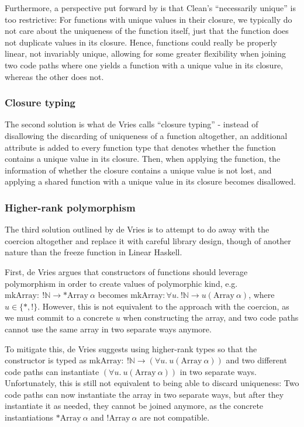 Furthermore, a perspective put forward by \cite{sergey_linearity_2022} is that Clean's ``necessarily unique'' is too restrictive: For functions with unique values in their closure, we typically do not care about the uniqueness of the function itself, just that the function does not duplicate values in its closure. Hence, functions could really be properly linear, not invariably unique, allowing for some greater flexibility when joining two code paths where one yields a function with a unique value in its closure, whereas the other does not.

\subsubsection{Closure typing}
The second solution is what de Vries calls ``closure typing'' - instead of disallowing the discarding of uniqueness of a function altogether, an additional attribute is added to every function type that denotes whether the function contains a unique value in its closure. Then, when applying the function, the information of whether the closure contains a unique value is not lost, and applying a shared function with a unique value in its closure becomes disallowed.

\subsubsection{Higher-rank polymorphism}
The third solution outlined by de Vries is to attempt to do away with the coercion altogether and replace it with careful library design, though of another nature than the freeze function in Linear Haskell. 

First, de Vries argues that constructors of functions should leverage polymorphism in order to create values of polymorphic kind, e.g.\ $\mathrm{mkArray} :\ !\mathbb{N} \to *\mathrm{Array}\ \alpha$ becomes $\mathrm{mkArray} : \forall u.\ !\mathbb{N} \to u(\mathrm{Array}\ \alpha)$, where $u \in \{*, !\}$. However, this is not equivalent to the approach with the coercion, as we must commit to a concrete $u$ when constructing the array, and two code paths cannot use the same array in two separate ways anymore. 

To mitigate this, de Vries suggests using higher-rank types so that the constructor is typed as $\mathrm{mkArray} : \ !\mathbb{N} \to (\forall u.\ u(\mathrm{Array}\ \alpha))$ and two different code paths can instantiate $(\forall u.\ u(\mathrm{Array}\ \alpha))$ in two separate ways. Unfortunately, this is still not equivalent to being able to discard uniqueness: Two code paths can now instantiate the array in two separate ways, but after they instantiate it as needed, they cannot be joined anymore, as the concrete instantiations $*\mathrm{Array}\ \alpha$ and $!\mathrm{Array}\ \alpha$ are not compatible.


